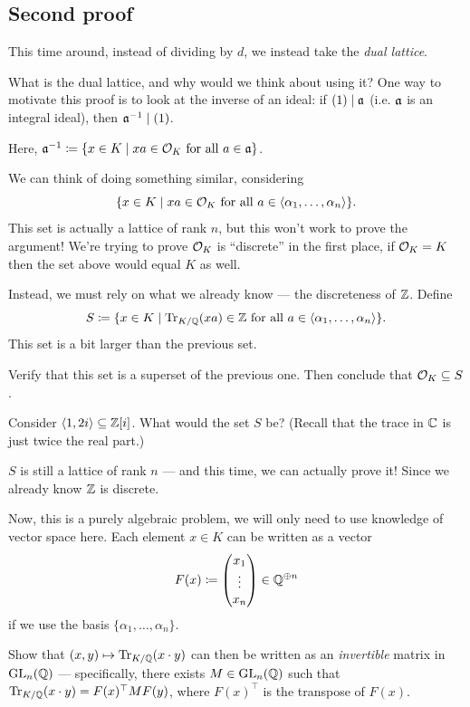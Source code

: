 \subsection{Second proof}

This time around, instead of dividing by $d$, we instead take the \emph{dual lattice}.

What is the dual lattice, and why would we think about using it?
One way to motivate this proof is to look at the inverse of an ideal:
if $(1) \mid \mathfrak a$ (i.e. $\mathfrak a$ is an integral ideal), then $\mathfrak a^{-1} \mid (1)$.

Here, $\mathfrak a^{-1} \coloneqq \{ x \in K \mid x a \in \mathcal O_K \text{ for all }a \in \mathfrak a\}$.

We can think of doing something similar, considering
\[
	\{ x \in K \mid x a \in \mathcal O_K \text{ for all }a \in \langle \alpha_1, \dots, \alpha_n\rangle \}.
\]
This set is actually a lattice of rank $n$, but this won't work to prove the argument!
We're trying to prove $\mathcal O_K$ is ``discrete'' in the first place, if $\mathcal O_K = K$ then the set above
would equal $K$ as well.

Instead, we must rely on what we already know --- the discreteness of $\mathbb Z$.
Define
\[
	S \coloneqq \{ x \in K \mid \operatorname{Tr}_{K/\mathbb Q}(x a) \in \mathbb Z \text{ for all }a \in
	\langle \alpha_1, \dots, \alpha_n\rangle \}.
\]
This set is a bit larger than the previous set.
\begin{ques}
	Verify that this set is a superset of the previous one. Then conclude that $\mathcal O_K \subseteq S$.
\end{ques}
\begin{exercise}
	Consider $\langle 1, 2i \rangle \subseteq \mathbb Z[i]$. What would the set $S$ be? (Recall that the
	trace in $\mathbb C$ is just twice the real part.)
\end{exercise}

$S$ is still a lattice of rank $n$ --- and this time, we can actually prove it! Since we already
know $\mathbb Z$ is discrete.

Now, this is a purely algebraic problem,
we will only need to use knowledge of vector space here.
Each element $x \in K$ can be written as a vector
\[ F(x) \coloneqq \begin{pmatrix} x_1 \\ \vdots \\ x_n \end{pmatrix} \in \mathbb Q^{\oplus n} \]
if we use the basis $\{ \alpha_1, \dots, \alpha_n \}$.

\begin{exercise}
	Show that $(x, y) \mapsto \operatorname{Tr}_{K/\mathbb Q}(x \cdot y)$ can then be written as an \emph{invertible} matrix in
	$\operatorname{GL}_n(\mathbb Q)$ ---
	specifically, there exists $M \in \operatorname{GL}_n(\mathbb Q)$ such that $\operatorname{Tr}_{K/\mathbb Q}(x \cdot y) = F(x)^\top M F(y)$,
	where $F(x)^\top$ is the transpose of $F(x)$.
\end{exercise}

